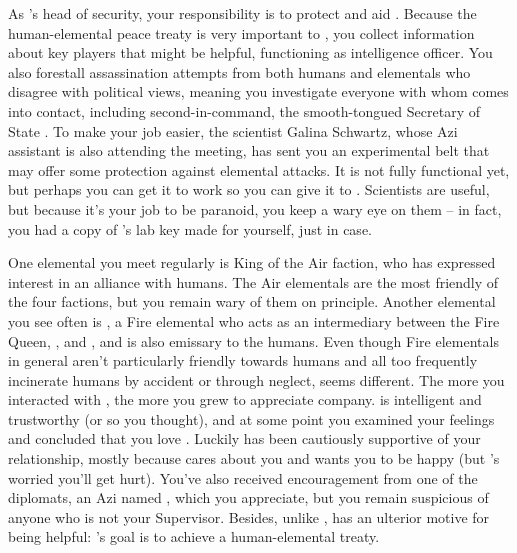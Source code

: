 \documentclass[char]{elementals}
\begin{document}
As \cLeader{}'s head of security, your responsibility is to protect and aid \cLeader{\them}.  Because the human-elemental peace treaty is very important to \cLeader{\them}, you collect information about key players that might be helpful, functioning as \cLeader{\their} intelligence officer.  You also forestall assassination attempts from both humans and elementals who disagree with \cLeader{\their} political views, meaning you investigate everyone with whom \cLeader{\they} comes into contact, including \cLeader{\their} second-in-command, the smooth-tongued Secretary of State \cDema{\intro}.  To make your job easier, the scientist Galina Schwartz, whose Azi assistant \cScientist{\intro} is also attending the meeting, has sent you an experimental belt that may offer some protection against elemental attacks.  It is not fully functional yet, but perhaps you can get it to work so you can give it to \cLeader{}.  Scientists are useful, but because it's your job to be paranoid, you keep a wary eye on them -- in fact, you had a copy of \cMS{\full}'s lab key made for yourself, just in case.

One elemental you meet regularly is King \cKing{\intro} of the Air faction, who has expressed interest in an alliance with humans.  The Air elementals are the most friendly of the four factions, but you remain wary of them on principle.  Another elemental you see often is \cJuliet{\intro}, a Fire elemental who acts as an intermediary between the Fire Queen, \cQueen{\intro}, and \cKing{}, and is also emissary to the humans.  Even though Fire elementals in general aren't particularly friendly towards humans and all too frequently incinerate humans by accident or through neglect, \cJuliet{} seems different.  The more you interacted with \cJuliet{\them}, the more you grew to appreciate \cJuliet{\their} company.  \cJuliet{\They} is intelligent and trustworthy (or so you thought), and at some point you examined your feelings and concluded that you love \cJuliet{\them}.  Luckily \cLeader{} has been cautiously supportive of your relationship, mostly because \cLeader{\they} cares about you and wants you to be happy (but \cLeader{\they}'s worried you'll get hurt).  You've also received encouragement from one of the diplomats, an Azi named \cDiplomat{\intro}, which you appreciate, but you remain suspicious of anyone who is not your Supervisor.  Besides, unlike \cLeader{}, \cDiplomat{\they} has an ulterior motive for being helpful: \cDiplomat{}'s goal is to achieve a human-elemental treaty.
\end{document}
